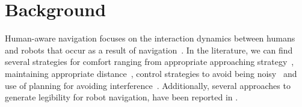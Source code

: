 \section{Background}
\label{sec:background}
Human-aware navigation focuses on the interaction dynamics between humans and robots that occur as a result of navigation~\cite{Kruse2013}. In the literature, we can find several strategies for comfort ranging from appropriate approaching strategy~\cite{Dautenhahn2006}, maintaining appropriate distance~\cite{Takayama2009}, control strategies to avoid being noisy~\cite{Martinson2007} and use of planning for avoiding interference~\cite{Vasquez2012}. Additionally, several approaches to generate legibility for robot navigation, have been reported in \cite{lichtenthaler2013towards}.
